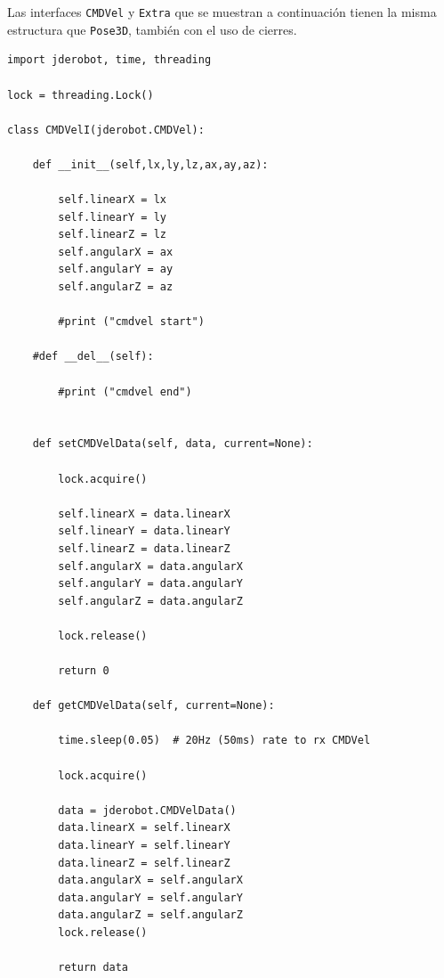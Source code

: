 Las interfaces \texttt{CMDVel} y \texttt{Extra} que se muestran a continuación tienen la misma estructura que \texttt{Pose3D}, también con el uso de cierres.

\begin{lstlisting}[frame=single]
import jderobot, time, threading

lock = threading.Lock()

class CMDVelI(jderobot.CMDVel):

    def __init__(self,lx,ly,lz,ax,ay,az):

        self.linearX = lx
        self.linearY = ly
        self.linearZ = lz
        self.angularX = ax
        self.angularY = ay
        self.angularZ = az

        #print ("cmdvel start")

    #def __del__(self):

        #print ("cmdvel end")


    def setCMDVelData(self, data, current=None):

        lock.acquire()

        self.linearX = data.linearX
        self.linearY = data.linearY
        self.linearZ = data.linearZ
        self.angularX = data.angularX
        self.angularY = data.angularY
        self.angularZ = data.angularZ

        lock.release()

        return 0

    def getCMDVelData(self, current=None):

        time.sleep(0.05)  # 20Hz (50ms) rate to rx CMDVel

        lock.acquire()

        data = jderobot.CMDVelData()
        data.linearX = self.linearX
        data.linearY = self.linearY
        data.linearZ = self.linearZ
        data.angularX = self.angularX
        data.angularY = self.angularY
        data.angularZ = self.angularZ
        lock.release()

        return data
        
\end{lstlisting} 

